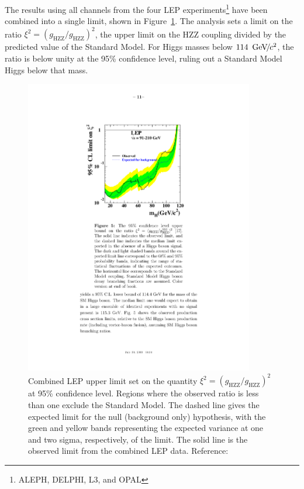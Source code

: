 The results using all channels from the four LEP experiments\footnote{ALEPH,
DELPHI, L3, and OPAL} have been combined into a single limit, shown in
Figure~\ref{fig:LEPHiggsLimit}.  The analysis sets a limit on the ratio $\xi^2 =
(g_\text{HZZ}/g_\text{HZZ})^2$, the upper limit on the HZZ coupling divided by
the predicted value of the Standard Model.  For Higgs masses below $114~{\,\text{Ge\hspace{-.08em}V\hspace{-0.16em}/\hspace{-0.08em}}c^\text{2}}$, the
ratio is below unity at the 95\% confidence level, ruling out a Standard Model
Higgs below that mass.
\begin{figure}
  \centering
  \includegraphics[width=100mm,angle=00]{theory_chapter/figures/lep_sm_limit.pdf}
  \caption[LEP Standard Model Higgs limit plot]{Combined LEP upper limit set on
  the quantity \mbox{$\xi^2 = (g_\text{HZZ}/g_\text{HZZ})^2$} at 95\% confidence
  level.  Regions where the observed ratio is less than one exclude the Standard
  Model.  The dashed line gives the expected limit for the null (background
  only) hypothesis, with the green and yellow bands representing the expected
  variance at one and two sigma, respectively, of the limit.  The solid line is
  the observed limit from the combined LEP data. Reference:~\cite{PDG}
  }
  \label{fig:LEPHiggsLimit}
\end{figure}

